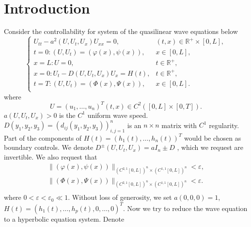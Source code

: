 \documentclass[a4paper,reqno,11pt]{amsart}
\numberwithin{equation}{section} %
\begin{document}
\section{Introduction}\label{intro sec}
Consider the controllability for system of the quasilinear wave equations below
\begin{equation}\label{42}
    \begin{cases}
	U_{tt}-a^2\left( U,U_t,U_x \right) U_{xx}=0,&		\left( t,x \right) \in \mathbb{R}^+\times \left[ 0,L \right] ,\\
	t=0:\left( U,U_t \right) =\left( \varphi  \left( x \right) ,\psi \left( x \right) \right) ,&		x\in \left[ 0,L \right] ,\\
	x=L:U=0,&		t\in \mathbb{R}^+,\\
	x=0:U_t-D\left( U,U_t,U_x \right) U_x=H\left( t \right) ,&		t\in \mathbb{R}^+,\\
	t=T:\left( U,U_t \right) =\left( \varPhi   \left( x \right) ,\varPsi  \left( x \right) \right) ,&		x\in \left[ 0,L \right] .\\
\end{cases}
\end{equation}
where
$$
U=\left(u_1, \ldots, u_n\right)^T(t, x) \in C^2([0,L]\times [0,T]) .
$$
$a\left(U, U_t, U_x\right)>0$ is the $C^1$ uniform wave speed. $D\left(y_1, y_2, y_3\right)=\left(d_{i j}\left(y_1, y_2, y_3\right)\right)_{i, j=1}^n$ is an   $n \times n$ matrix with $C^1$ regularity. Part of the components of $H(t)=\left(h_1(t), \ldots, h_n(t)\right)^T$ would be chosen as boundary controls. We denote $D^{\pm}\left( U,U_t,U_x \right) =a I_n \pm D $ , which we request are invertible. We also request that
$$
\begin{aligned}
	\lVert \left( \varphi  \left( x \right) ,\psi \left( x \right) \right) \rVert _{\left( C^{2,1}\left[ 0,L \right] \right) ^n\times \left( C^{1,1}\left[ 0,L \right] \right) ^n}  < \varepsilon ,\\
	\lVert \left( \varPhi   \left( x \right) ,\Psi \left( x \right) \right) \rVert _{\left( C^{2,1}\left[ 0,L \right] \right) ^n\times \left( C^{1,1}\left[ 0,L \right] \right) ^n}  < \varepsilon .\\
\end{aligned}
$$
where $0 < \varepsilon < \varepsilon _0 \ll 1$.
Without loss of generosity, we set $a(0,0,0)=1$, \ $H(t)=\left(h_1(t), \ldots, h_p(t), 0, \ldots, 0\right)^T$. Now we try to reduce the wave equation to a hyperbolic equation system. Denote
\end{document}
